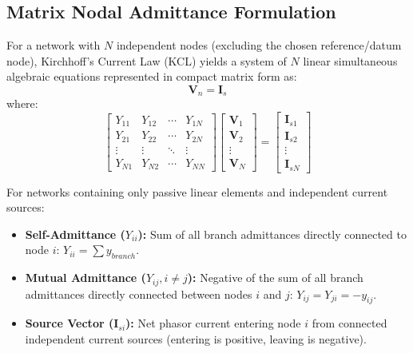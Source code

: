 \documentclass[12pt,a4paper]{article}
\begin{document}
\subsection{Matrix Nodal Admittance Formulation}
For a network with $N$ independent nodes (excluding the chosen reference/datum node), Kirchhoff's Current Law (KCL) yields a system of $N$ linear simultaneous algebraic equations represented in compact matrix form as:
\begin{equation}
  [\mathbf{Y}] \mathbf{V}_n = \mathbf{I}_s
\end{equation}
where:
\begin{equation}
  \begin{bmatrix}
    Y_{11} & Y_{12} & \cdots & Y_{1N} \\
    Y_{21} & Y_{22} & \cdots & Y_{2N} \\
    \vdots & \vdots & \ddots & \vdots \\
    Y_{N1} & Y_{N2} & \cdots & Y_{NN}
  \end{bmatrix}
  \begin{bmatrix}
    \mathbf{V}_1 \\ \mathbf{V}_2 \\ \vdots \\ \mathbf{V}_N
  \end{bmatrix}
  =
  \begin{bmatrix}
    \mathbf{I}_{s1} \\ \mathbf{I}_{s2} \\ \vdots \\ \mathbf{I}_{sN}
  \end{bmatrix}
\end{equation}

\begin{tcolorbox}[formulabox, title={\textbf{Inspection Rules for Nodal Admittance Matrix $[\mathbf{Y}]$}}]
For networks containing only passive linear elements and independent current sources:
\begin{itemize}[leftmargin=*, itemsep=2pt]
  \item \textbf{Self-Admittance ($Y_{ii}$):} Sum of all branch admittances directly connected to node $i$: $Y_{ii} = \sum y_{branch}$.
  \item \textbf{Mutual Admittance ($Y_{ij}, i \ne j$):} Negative of the sum of all branch admittances directly connected between nodes $i$ and $j$: $Y_{ij} = Y_{ji} = -y_{ij}$.
  \item \textbf{Source Vector ($\mathbf{I}_{si}$):} Net phasor current entering node $i$ from connected independent current sources (entering is positive, leaving is negative).
\end{itemize}
\end{tcolorbox}
\end{document}
